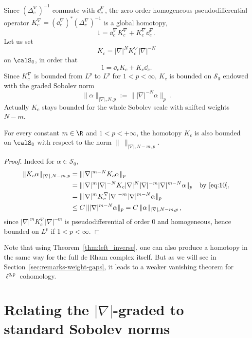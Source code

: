 Since $(\Delta_c^{\nabla})^{-1}$ commute with $\dd_c^{\nabla}$, the zero order homogeneous pseudodifferential operator $K_c^\nabla = (\dd_c^{\nabla})^* (\Delta_c^{\nabla})^{-1} $ is a global homotopy,
\[
1 = \dd_c^\nabla K_c^\nabla + K_c^\nabla \dd_c^\nabla.
\]
Let us set
\[
K_c = |\nabla|^{N}K_c^\nabla|\nabla|^{-N}
\]
on $\calS_0$, in order that
\[
1 = \dd_c K_c + K_c \dd_c.
\]
Since $K_c^\nabla$ is bounded from $L^p$ to $L^p$ for $1<p< \infty$, $K_c$ is bounded on $\mathcal{S}_0$ endowed with the graded Sobolev norm
\[
\|\alpha\|_{|\nabla|,N,p}:=\||\nabla|^{-N}\alpha\|_p \,.
\]
Actually $K_c$ stays bounded for the whole Sobolev scale with shifted weights $N - m$.

\begin{prop}\label{prop:K_c_scale}
For every constant $m\in\R$ and $1< p< +\infty$, the homotopy $K_c$ is also bounded on $\calS_0$ with respect to the norm $\| \ \|_{|\nabla|,N-m,p}$.
\end{prop}

\begin{proof}
Indeed for $\alpha\in \mathcal{S}_0$,
\begin{align*}
\|K_c \alpha\|_{|\nabla|,N-m,p} &= \||\nabla|^{m-N}K_c\alpha\|_{p}\\
&= \||\nabla|^m | \nabla|^{-N}K_c| \nabla|^{N} |\nabla|^{-m} |\nabla|^{m-N}\alpha\|_{p} \quad \text{by}~\eqref{eq:10},\\
&=\||\nabla|^m K_c^\nabla|\nabla|^{- m}|
\nabla|^{m-N}\alpha\|_{p} \\
&\leq C\, \|| \nabla|^{m-N}\alpha\|_{p} =C\, \|\alpha\|_{|\nabla|,N-m,p} \,,
\end{align*}
since $|\nabla|^m K_c^\nabla|\nabla|^{- m}$ is pseudodifferential of order $0$ and homogeneous, hence bounded on $L^p$ if $1< p< \infty$.
\end{proof}

\begin{rema}\label{rem:1}
Note that using Theorem~\ref{thm:left_inverse}, one can also produce a homotopy in the same way for the full de Rham complex itself. But as we will see in Section~\ref{sec:remarks-weight-gaps}, it leads to a weaker vanishing theorem for $\ell^{q,p}$ cohomology.
\end{rema}


\section{Relating the \texorpdfstring{$|\nabla|$-}{|nabla|-}graded to standard Sobolev norms}

